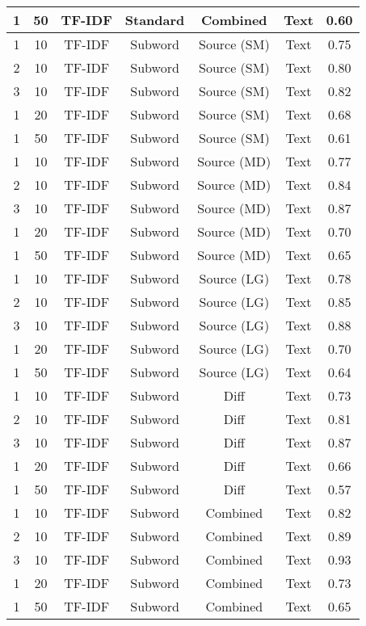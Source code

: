 \begin{longtable}{|c|c|c|c|c|c|c|}
\hline
1 & 50 & TF-IDF & Standard & Combined & Text & 0.60 \\
\hline
1 & 10 & TF-IDF & Subword & Source (SM) & Text & 0.75 \\
\hline
2 & 10 & TF-IDF & Subword & Source (SM) & Text & 0.80 \\
\hline
3 & 10 & TF-IDF & Subword & Source (SM) & Text & 0.82 \\
\hline
1 & 20 & TF-IDF & Subword & Source (SM) & Text & 0.68 \\
\hline
1 & 50 & TF-IDF & Subword & Source (SM) & Text & 0.61 \\
\hline
1 & 10 & TF-IDF & Subword & Source (MD) & Text & 0.77 \\
\hline
2 & 10 & TF-IDF & Subword & Source (MD) & Text & 0.84 \\
\hline
3 & 10 & TF-IDF & Subword & Source (MD) & Text & 0.87 \\
\hline
1 & 20 & TF-IDF & Subword & Source (MD) & Text & 0.70 \\
\hline
1 & 50 & TF-IDF & Subword & Source (MD) & Text & 0.65 \\
\hline
1 & 10 & TF-IDF & Subword & Source (LG) & Text & 0.78 \\
\hline
2 & 10 & TF-IDF & Subword & Source (LG) & Text & 0.85 \\
\hline
3 & 10 & TF-IDF & Subword & Source (LG) & Text & 0.88 \\
\hline
1 & 20 & TF-IDF & Subword & Source (LG) & Text & 0.70 \\
\hline
1 & 50 & TF-IDF & Subword & Source (LG) & Text & 0.64 \\
\hline
1 & 10 & TF-IDF & Subword & Diff & Text & 0.73 \\
\hline
2 & 10 & TF-IDF & Subword & Diff & Text & 0.81 \\
\hline
3 & 10 & TF-IDF & Subword & Diff & Text & 0.87 \\
\hline
1 & 20 & TF-IDF & Subword & Diff & Text & 0.66 \\
\hline
1 & 50 & TF-IDF & Subword & Diff & Text & 0.57 \\
\hline
1 & 10 & TF-IDF & Subword & Combined & Text & 0.82 \\
\hline
2 & 10 & TF-IDF & Subword & Combined & Text & 0.89 \\
\hline
3 & 10 & TF-IDF & Subword & Combined & Text & 0.93 \\
\hline
1 & 20 & TF-IDF & Subword & Combined & Text & 0.73 \\
\hline
1 & 50 & TF-IDF & Subword & Combined & Text & 0.65 \\

\end{longtable}
